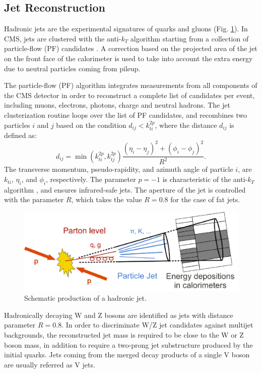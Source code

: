 \subsection{Jet Reconstruction}
\label{JetSection}
Hadronic jets are the experimental signatures of quarks and gluons (Fig. \ref{jets}). In CMS, jets are clustered with the anti-$k_T$ algorithm \cite{Cacciari:2008gp} starting from a collection of particle-flow (PF) candidates \cite{CMS:2009nxa,CMS:2010byl}. A correction based on the projected area of the jet on the front face of the calorimeter is used to take into account the extra energy due to neutral particles coming from pileup.  

The particle-flow (PF) algorithm integrates measurements from all components of the CMS detector in order to reconstruct a complete list of candidates per event, including muons, electrons, photons, charge and neutral hadrons. The jet clusterization routine loops over the list of PF candidates, and recombines two particles $i$ and $j$ based on the condition $d_{ij} < k_{ti}^{2p}$, where the distance $d_{ij}$ is defined as: 
\begin{equation}
	d_{ij} = \min(k_{ti}^{2p}, k_{tj}^{2p}) \frac{(\eta_i - \eta_j)^2 + (\phi_i - \phi_j)^2}{R^2}.
\end{equation}
The transverse momentum, pseudo-rapidity, and azimuth angle of particle $i$, are $k_{ti}$, $\eta_i$, and $\phi_i$, respectively. The parameter $p=-1$ is characteristic of the anti-$k_T$ algorithm \cite{Cacciari:2008gp}, and ensures infrared-safe jets. The aperture of the jet is controlled with the parameter $R$, which takes the value $R=0.8$ for the case of fat jets.  

\begin{figure}[ht]
\centering
\includegraphics[scale=0.22]{figures/experiment/CaloJet.png} 
\caption[Collimated spray of particles]{Schematic production of a hadronic jet.}
\label{jets}
\end{figure}

Hadronically decaying W and Z bosons are identified as jets with distance parameter $R=0.8$. In order to discriminate W/Z jet candidates against multijet backgrounds, the reconstructed jet mass is required to be close to the W or Z boson mass, in addition to require a two-prong jet substructure produced by the initial quarks. Jets coming from the merged decay products of a single V boson are usually referred as V jets. 

